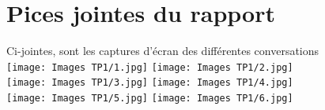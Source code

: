 \documentclass[12pt, a4paper]{article}
\begin{document}
\section{Pices jointes du rapport}
Ci-jointes, sont les captures d'écran des différentes conversations\\
\texttt{[image: Images TP1/1.jpg]}
\texttt{[image: Images TP1/2.jpg]}\\
\texttt{[image: Images TP1/3.jpg]}
\texttt{[image: Images TP1/4.jpg]}\\
\texttt{[image: Images TP1/5.jpg]}
\texttt{[image: Images TP1/6.jpg]}
\end{document}
